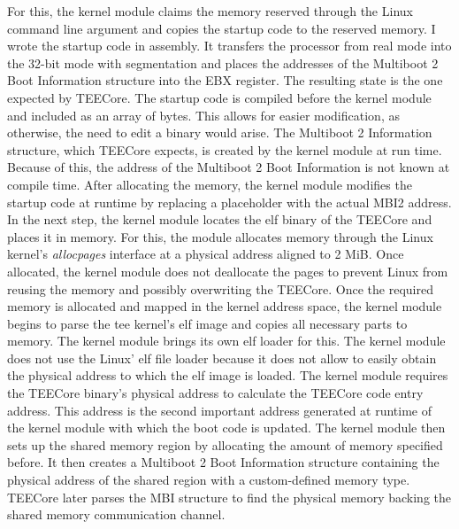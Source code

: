 For this, the kernel module claims the memory reserved through the Linux command
line argument and copies the startup code to the reserved memory. I wrote the
startup code in assembly. It transfers the processor from real mode into the
32-bit mode with segmentation and places the addresses of the Multiboot 2 Boot
Information structure into the EBX register. The resulting state is the one
expected by TEECore. The startup code is compiled before the kernel module and
included as an array of bytes. This allows for easier modification, as
otherwise, the need to edit a binary would arise. The Multiboot 2 Information
structure, which TEECore expects, is created by the kernel module at run time.
Because of this, the address of the Multiboot 2 Boot Information is not known at
compile time. After allocating the memory, the kernel module modifies the
startup code at runtime by replacing a placeholder with the actual MBI2
address.\\

In the next step, the kernel module locates the \gls{elf} binary of the TEECore
and places it in memory. For this, the module allocates memory through the Linux
kernel's \textit{allocpages} interface at a physical address aligned to 2 MiB.
Once allocated, the kernel module does not deallocate the pages to prevent Linux
from reusing the memory and possibly overwriting the TEECore. Once the required
memory is allocated and mapped in the kernel address space, the kernel module
begins to parse the \gls{tee} kernel's \gls{elf} image and copies all necessary
parts to memory. The kernel module brings its own \gls{elf} loader for this. The
kernel module does not use the Linux' \gls{elf} file loader because it does not
allow to easily obtain the physical address to which the \gls{elf} image is
loaded. The kernel module requires the TEECore binary's physical address to
calculate the TEECore code entry address. This address is the second important
address generated at runtime of the kernel module with which the boot code is
updated. The kernel module then sets up the shared memory region by allocating
the amount of memory specified before. It then creates a Multiboot 2 Boot
Information structure containing the physical address of the shared region with
a custom-defined memory type. TEECore later parses the MBI structure to find the
physical memory backing the shared memory communication channel.\\

